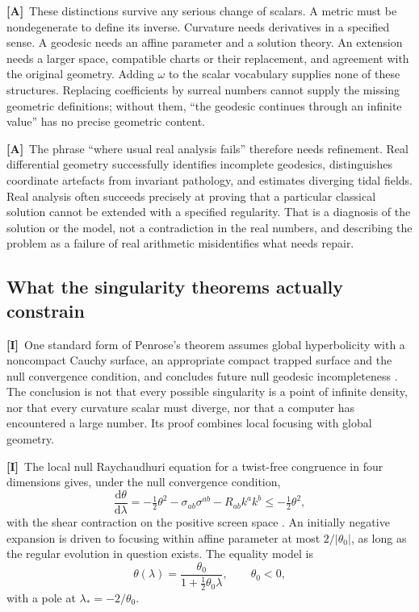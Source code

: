 \documentclass[11pt,letterpaper]{article}
\numberwithin{equation}{section}
\theoremstyle{definition}
\theoremstyle{remark}
\newcommand{\dd}{\mathrm d}
\newcommand{\abs}[1]{\lvert#1\rvert}
\newcommand{\TA}{\textcolor{TierA}{\textsf{\bfseries[A]}}}
\newcommand{\TI}{\textcolor{TierI}{\textsf{\bfseries[I]}}}
\begin{document}
\TA\ These distinctions survive any serious change of scalars. A metric must be
nondegenerate to define its inverse. Curvature needs derivatives in a specified
sense. A geodesic needs an affine parameter and a solution theory. An extension
needs a larger space, compatible charts or their replacement, and agreement
with the original geometry. Adding $\omega$ to the scalar vocabulary supplies
none of these structures. Replacing coefficients by surreal numbers cannot
supply the missing geometric definitions; without them, ``the geodesic
continues through an infinite value'' has no precise geometric content.

\TA\ The phrase ``where usual real analysis fails'' therefore needs refinement.
Real differential geometry successfully identifies incomplete geodesics,
distinguishes coordinate artefacts from invariant pathology, and estimates
diverging tidal fields. Real analysis often succeeds precisely at proving that
a particular classical solution cannot be extended with a specified
regularity. That is a diagnosis of the solution or the model, not a
contradiction in the real numbers, and describing the problem as a failure of
real arithmetic misidentifies what needs repair.

\subsection{What the singularity theorems actually constrain}
\label{phys:sub:theorems}

\TI\ One standard form of Penrose's theorem assumes global hyperbolicity with
a noncompact Cauchy surface, an appropriate compact trapped surface and the
null convergence condition, and concludes future null geodesic incompleteness
\cite{phys:Penrose,phys:Witten,phys:Landsman}. The conclusion is not that
every possible singularity is a point of infinite density, nor that every
curvature scalar must diverge, nor that a computer has encountered a large
number. Its proof combines local focusing with global geometry.

\TI\ The local null Raychaudhuri equation for a twist-free congruence in four
dimensions gives, under the null convergence condition,
\begin{equation}\label{phys:eq:ray}
\frac{\dd\theta}{\dd\lambda}
=-\tfrac12\theta^{2}-\sigma_{ab}\sigma^{ab}-R_{ab}k^{a}k^{b}
\le-\tfrac12\theta^{2},
\end{equation}
with the shear contraction on the positive screen space
\cite{phys:Raychaudhuri,phys:Witten}. An initially negative expansion is driven
to focusing within affine parameter at most $2/\abs{\theta_{0}}$, as long as
the regular evolution in question exists. The equality model is
\begin{equation}\label{phys:eq:raymodel}
\theta(\lambda)=\frac{\theta_{0}}{1+\tfrac12\theta_{0}\lambda},
\qquad\theta_{0}<0,
\end{equation}
with a pole at $\lambda_{*}=-2/\theta_{0}$.
\end{document}
